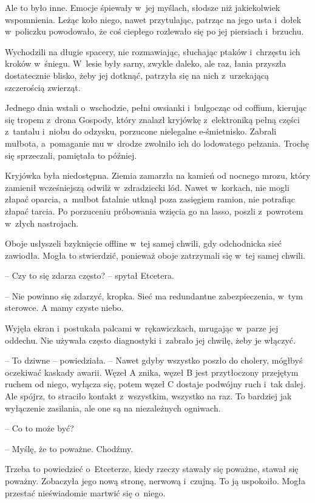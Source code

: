 \documentclass[oneside,polish,11pt,sfheadings]{mwbk}
\begin{document}
Ale to było inne. Emocje śpiewały w~jej myślach, słodsze niż
jakiekolwiek wspomnienia. Leżąc koło niego, nawet przytulając, patrząc
na jego usta i~dołek w~policzku powodowało, że coś ciepłego rozlewało
się po jej piersiach i~brzuchu.

Wychodzili na długie spacery, nie rozmawiając, słuchając ptaków i~chrzęstu ich kroków w~śniegu. W~lesie były sarny, zwykle daleko, ale
raz, łania przyszła dostatecznie blisko, żeby jej dotknąć, patrzyła się
na nich z~urzekającą szczerością zwierząt.

Jednego dnia wstali o~wschodzie, pełni owsianki i~bulgocząc od coffium,
kierując się tropem z~drona Gospody, który znalazł kryjówkę z~elektroniką pełną części z~tantalu i~niobu do odzysku, porzucone
nielegalne e-śmietnisko. Zabrali mułbota, a~pomaganie mu w~drodze
zwolniło ich do lodowatego pełzania. Trochę się sprzeczali, pamiętała to
później.

Kryjówka była niedostępna. Ziemia zamarzła na kamień od nocnego mrozu,
który zamienił wcześniejszą odwilż w~zdradziecki lód. Nawet w~korkach,
nie mogli złapać oparcia, a~mułbot fatalnie utknął poza zasięgiem
ramion, nie potrafiąc złapać tarcia. Po porzuceniu próbowania wzięcia go
na lasso, poszli z~powrotem w~złych nastrojach.

Oboje usłyszeli bzyknięcie offline w~tej samej chwili, gdy odchodnicka
sieć zawiodła. Mogła to stwierdzić, ponieważ oboje zatrzymali się w~tej
samej chwili.

-- Czy to się zdarza często? -- spytał Etcetera.

-- Nie powinno się zdarzyć, kropka. Sieć ma redundantne zabezpieczenia, w~tym sterowce. A mamy czyste niebo.

Wyjęła ekran i~postukała palcami w~rękawiczkach, mrugając w~parze jej
oddechu. Nie używała często diagnostyki i~zabrało jej chwilę, żeby je
włączyć. 

-- To dziwne -- powiedziała. -- Nawet gdyby wszystko poszło do
cholery, mógłbyś oczekiwać kaskady awarii. Węzeł A znika, węzeł B jest
przytłoczony przejętym ruchem od niego, wyłącza się, potem węzeł C
dostaje podwójny ruch i~tak dalej. Ale spójrz, to straciło kontakt z~wszystkim, wszystko na raz. To bardziej jak wyłączenie zasilania, ale
one są na niezależnych ogniwach.

-- Co to może być?

-- Myślę, że to poważne. Chodźmy.

Trzeba to powiedzieć o~Etceterze, kiedy rzeczy stawały się poważne,
stawał się poważny. Zobaczyła jego nową stronę, nerwową i~czujną. To ją
uspokoiło. Mogła przestać nieświadomie martwić się o~niego.
\end{document}
